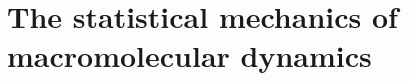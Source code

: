 






%









\chapter{The statistical mechanics of macromolecular dynamics}
\label{chapter:statistical-mechanics}


%



%
%



\appendix

%



%



